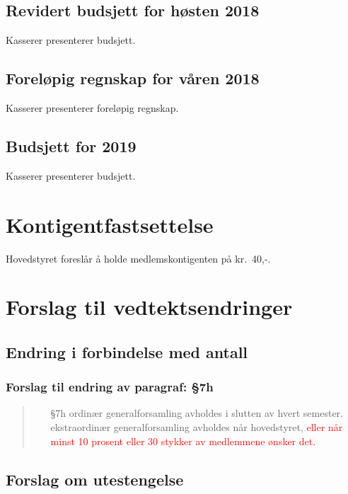 \documentclass[10pt,norsk,a4paper]{article}
\begin{document}
\subsection{Revidert budsjett for høsten 2018}
Kasserer presenterer budsjett.

\subsection{Foreløpig regnskap for våren 2018}
Kasserer presenterer foreløpig regnskap.

\subsection{Budsjett for 2019}
Kasserer presenterer budsjett.

\section{Kontigentfastsettelse}
Hovedstyret foreslår å holde medlemskontigenten på kr.~40,-.

\newpage

\section{Forslag til vedtektsendringer}

\subsection{Endring i forbindelse med antall }
\subsubsection{Forslag til endring av paragraf: §7h}
\begin{quote}
	\begin{enumerate}
		\item[§7h]
            ordinær generalforsamling avholdes i slutten av hvert semester.
            ekstraordinær generalforsamling avholdes når hovedstyret,
            \textcolor{red}{eller når minst 10 prosent eller 30 stykker av medlemmene ønsker det.}
	\end{enumerate}
\end{quote}

\subsection{Forslag om utestengelse}
\end{document}
